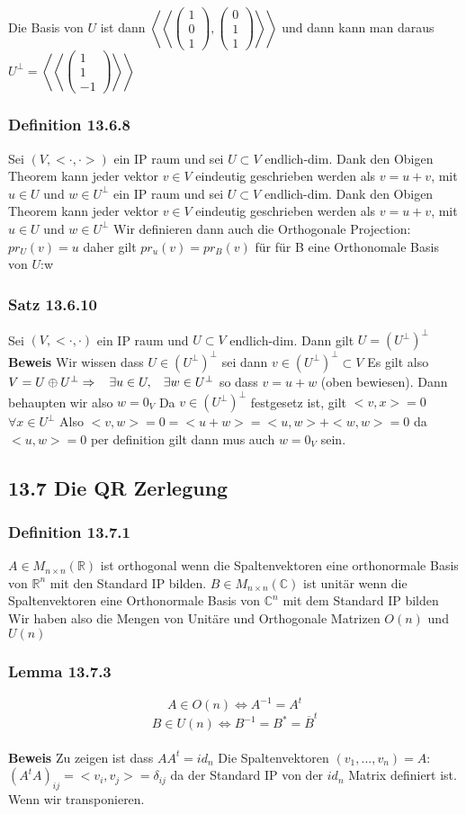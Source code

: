 \documentclass{article}
\newcommand{\smspc}{\hspace{0.3cm}}
\newcommand{\kk}[1]{\left<\left<{#1}\right>\right>}
\newcommand{\satz}[1]{\subsubsection*{Satz {#1}}}
\newcommand{\beweis}{\\\textbf{Beweis }}
\newcommand{\lemma}[1]{\subsubsection*{Lemma {#1}}}
\newcommand{\definition}[1]{\subsubsection*{Definition {#1}}}
\begin{document}
  Die Basis von $U$ ist dann $\kk{\begin{pmatrix}1\\0\\1\end{pmatrix},\begin{pmatrix}0\\1\\1\end{pmatrix}}$ und dann kann man daraus $U^\perp=\kk{\begin{pmatrix}1\\1\\-1\end{pmatrix}}$
  \definition{13.6.8} Sei $(V,<\cdot,\cdot>)$ ein IP raum und sei $U\subset V$ endlich-dim. Dank den Obigen Theorem kann jeder vektor $v\in V$ eindeutig geschrieben werden als $v=u+v$, mit $u\in U$ und $w\in U^\perp$ ein IP raum und sei $U\subset V$ endlich-dim. Dank den Obigen Theorem kann jeder vektor $v\in V$ eindeutig geschrieben werden als $v=u+v$, mit $u\in U$ und $w\in U^\perp$  
Wir definieren dann auch die Orthogonale Projection:$pr_U(v)=u$ daher gilt $pr_u(v)=pr_B(v)$ für für B eine Orthonomale Basis von $U$:w
\satz{13.6.10} Sei $(V,<\cdot,\cdot)$ ein IP raum und $U\subset V$ endlich-dim. Dann gilt $U=(U^\perp)^\perp$
\beweis Wir wissen dass $U\in(U^\perp)^\perp$ sei dann $v\in (U^\perp)^\perp\subset V$ Es gilt also $V=U\oplus U^\perp\Rightarrow\smspc \exists u \in U, \smspc \exists w\in U^\perp$ so dass $v=u+w$ (oben bewiesen). Dann behaupten wir also $w=0_V$
Da $v\in(U^\perp)^\perp$ festgesetz ist, gilt $<v,x>=0$ $\forall x\in U^\perp$ Also $<v,w>=0=<u+w>={<u,w>}+<w,w>=0$ da $<u,w>=0$ per definition gilt dann mus auch $w=0_V$ sein.
\subsection*{13.7 Die QR Zerlegung}
\definition{13.7.1} $A\in M_{n\times n}(\mathbb{R})$ ist orthogonal wenn die Spaltenvektoren eine orthonormale Basis von $\mathbb{R}^n$ mit den Standard IP bilden.\newline
$B\in M_{n\times n}(\mathbb{C})$ ist unitär wenn die Spaltenvektoren eine Orthonormale Basis von $\mathbb{C}^n$ mit dem Standard IP bilden\newline
Wir haben also die Mengen von Unitäre und Orthogonale Matrizen $O(n)$ und $U(n)$
\lemma{13.7.3} \[A\in O(n)\Leftrightarrow A^{-1}=A^t\]\[B\in U(n)\Leftrightarrow B^{-1}=B^*=\overline{B}^t\]
\beweis Zu zeigen ist dass $AA^t=id_n$ Die Spaltenvektoren $(v_1,...,v_n)=A$: $(A^tA)_{ij}=<v_i,v_j>=\delta_{ij}$ da der Standard IP von der $id_n$ Matrix definiert ist. Wenn wir transponieren.
\end{document}

